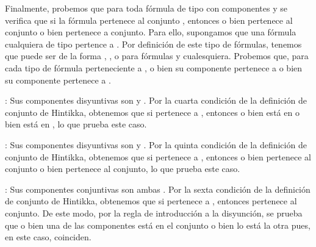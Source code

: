 \begin{isabellebody}
\begin{isamarkuptext}
\begin{demostracion}
  Finalmente, probemos que para toda fórmula de tipo \isa{{\isasymbeta}} con componentes  y 
   se verifica que si la fórmula pertenece al conjunto , entonces o bien  
  pertenece al conjunto o bien  pertenece a conjunto. Para ello, supongamos que 
  una fórmula cualquiera de tipo \isa{{\isasymbeta}} pertence a . Por definición de este tipo de
  fórmulas, tenemos que \isa{{\isasymbeta}} puede ser de la forma , ,  
  o  para fórmulas  y  cualesquiera. Probemos que, para cada
  tipo de fórmula \isa{{\isasymbeta}} perteneciente a , o bien su componente  pertenece a  
  o bien su componente  pertenece a .

  : Sus componentes disyuntivas son  y . 
    Por la cuarta condición de la definición de conjunto de Hintikka, obtenemos 
    que si  pertenece a , entonces o bien  está en  o bien  está
    en , lo que prueba este caso.

  : Sus componentes disyuntivas son  y .
    Por la quinta condición de la definición de conjunto de Hintikka, obtenemos que
    si  pertenece a , entonces o bien  pertenece al conjunto o bien
     pertenece al conjunto, lo que prueba este caso.

  : Sus componentes conjuntivas son ambas .
    Por la sexta condición de la definición de conjunto de Hintikka, obtenemos 
    que si  pertenece a , entonces  pertenece al conjunto. De este modo,
    por la regla de introducción a la disyunción, se prueba que o bien una de las 
    componentes está en el conjunto o bien lo está la otra pues, en este caso,
    coinciden.


\end{demostracion}
\end{isamarkuptext}
\end{isabellebody}
